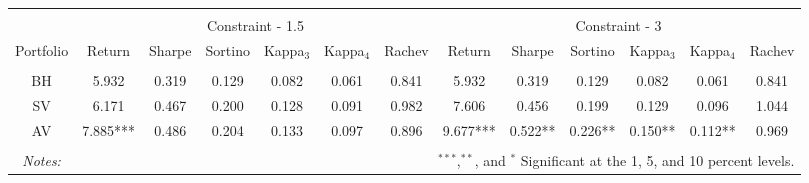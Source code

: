 \begin{tabular}{@{\extracolsep{5pt}} ccccccccccccc} 
\hline \\[-1.8ex] 
& \multicolumn{6}{c}{Constraint - 1.5} &\multicolumn{6}{c}{Constraint - 3}\\
\cline{2-7} \cline{8-13}
Portfolio & Return & Sharpe & Sortino & Kappa$_{3}$ & Kappa$_{4}$ & Rachev & Return & Sharpe & Sortino & Kappa$_{3}$ & Kappa$_{4}$ & Rachev \\ 
\hline \\[-1.8ex] 
BH & 5.932 & 0.319 & 0.129 & 0.082 & 0.061 & 0.841 & 5.932 & 0.319 & 0.129 & 0.082 & 0.061 & 0.841 \\ 
SV & 6.171 & 0.467 & 0.200 & 0.128 & 0.091 & 0.982 & 7.606 & 0.456 & 0.199 & 0.129 & 0.096 & 1.044 \\ 
AV & 7.885*** & 0.486 & 0.204 & 0.133 & 0.097 & 0.896 & 9.677*** & 0.522** & 0.226** & 0.150** & 0.112** & 0.969 \\ 
\hline\\
\textit{Notes:} & \multicolumn{12}{r}{$^{***}$,$^{**}$, and $^{*}$ Significant at the 1, 5, and 10 percent levels.}
\end{tabular}